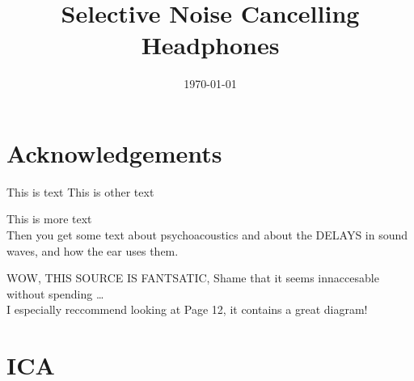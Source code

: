 \documentclass{ecsproject}
\title{Selective Noise Cancelling Headphones}
\date{\today}
\begin{document}
\maketitle

\chapter*{Acknowledgements}


\tableofcontents
{}

\listoffigures
{}

\listoftables
{}

This is text \cite{EMHeadsets}
This is other text \cite{EMNoiseCancel}

This is more \cite{ICAAlg&Apps} text\\
Then you get some text about psychoacoustics \cite{MusCogCompSou} and about the DELAYS in sound waves, and how the ear uses them.

WOW, THIS SOURCE\cite{AdvancedDSPing} IS FANTSATIC, Shame that it seems innaccesable without spending \ldots \\
I especially reccommend looking at Page 12, it contains a great diagram!




\appendix
\chapter{ICA}

\end{document}
